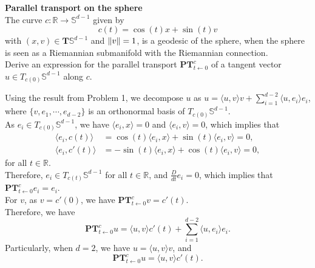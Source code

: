 \documentclass[en, oneside]{assignment}
\begin{document}
\begin{prob} \textbf{Parallel transport on the sphere}\\
    The curve $c: \mathbb{R} \rightarrow \mathbb{S}^{d-1}$ given by
    \begin{equation*}
        c(t) = \cos(t) x + \sin(t) v
    \end{equation*}
    with $(x, v) \in \mathbf{T} \mathbb{S}^{d-1}$ and $\left\lVert v\right\rVert = 1$, is a geodesic of the sphere, 
    when the sphere is seen as a Riemannian submanifold with the Riemannian connection.\\
    Derive an expression for the parallel transport $\mathbf{P} \mathbf{T}^c_{t \leftarrow 0}$ of a tangent vector $u \in T_{c(0)} \mathbb{S}^{d-1}$ along $c$.
\end{prob}

\begin{sol}
    Using the result from Problem 1, we decompose $u$ as $u = \langle u, v \rangle v + \sum_{i=1}^{d-2} \langle u, e_i \rangle e_i$, where $\{v, e_1, \cdots, e_{d-2}\}$ is an orthonormal basis of $T_{c(0)} \mathbb{S}^{d-1}$.\\
    As $e_i \in T_{c(0)} \mathbb{S}^{d-1}$, we have $\langle e_i, x \rangle = 0$ and $\langle e_i, v \rangle = 0$, 
    which implies that
    \begin{align*}
        \langle e_i, c(t) \rangle &= \cos(t) \langle e_i, x \rangle + \sin(t) \langle e_i, v \rangle = 0,\\
        \langle e_i, c'(t) \rangle &= -\sin(t) \langle e_i, x \rangle + \cos(t) \langle e_i, v \rangle = 0,
    \end{align*}
    for all $t \in \mathbb{R}$.\\
    Therefore, $e_i \in T_{c(t)} \mathbb{S}^{d-1}$ for all $t \in \mathbb{R}$, and $\frac{D}{dt} e_i = 0$, which implies that $\mathbf{P} \mathbf{T}^c_{t \leftarrow 0} e_i = e_i$.\\
    For $v$, as $v = c'(0)$, we have $\mathbf{P} \mathbf{T}^c_{t \leftarrow 0} v = c'(t)$.\\
    Therefore, we have
    \begin{equation*}
        \mathbf{P} \mathbf{T}^c_{t \leftarrow 0} u = \langle u, v \rangle c'(t) + \sum_{i=1}^{d-2} \langle u, e_i \rangle e_i.
    \end{equation*}
    Particularly, when $d = 2$, we have $u = \langle u, v \rangle v$, and
    \begin{equation*}
        \mathbf{P} \mathbf{T}^c_{t \leftarrow 0} u = \langle u, v \rangle c'(t).
    \end{equation*}
\end{sol}
\end{document}
